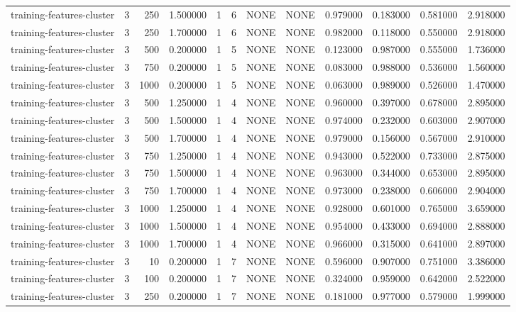 \begin{tabular}{lrrrllllrrrr}
training-features-cluster & 3 & 250 & 1.500000 & 1 & 6 & NONE & NONE & 0.979000 & 0.183000 & 0.581000 & 2.918000 \\
training-features-cluster & 3 & 250 & 1.700000 & 1 & 6 & NONE & NONE & 0.982000 & 0.118000 & 0.550000 & 2.918000 \\
training-features-cluster & 3 & 500 & 0.200000 & 1 & 5 & NONE & NONE & 0.123000 & 0.987000 & 0.555000 & 1.736000 \\
training-features-cluster & 3 & 750 & 0.200000 & 1 & 5 & NONE & NONE & 0.083000 & 0.988000 & 0.536000 & 1.560000 \\
training-features-cluster & 3 & 1000 & 0.200000 & 1 & 5 & NONE & NONE & 0.063000 & 0.989000 & 0.526000 & 1.470000 \\
training-features-cluster & 3 & 500 & 1.250000 & 1 & 4 & NONE & NONE & 0.960000 & 0.397000 & 0.678000 & 2.895000 \\
training-features-cluster & 3 & 500 & 1.500000 & 1 & 4 & NONE & NONE & 0.974000 & 0.232000 & 0.603000 & 2.907000 \\
training-features-cluster & 3 & 500 & 1.700000 & 1 & 4 & NONE & NONE & 0.979000 & 0.156000 & 0.567000 & 2.910000 \\
training-features-cluster & 3 & 750 & 1.250000 & 1 & 4 & NONE & NONE & 0.943000 & 0.522000 & 0.733000 & 2.875000 \\
training-features-cluster & 3 & 750 & 1.500000 & 1 & 4 & NONE & NONE & 0.963000 & 0.344000 & 0.653000 & 2.895000 \\
training-features-cluster & 3 & 750 & 1.700000 & 1 & 4 & NONE & NONE & 0.973000 & 0.238000 & 0.606000 & 2.904000 \\
training-features-cluster & 3 & 1000 & 1.250000 & 1 & 4 & NONE & NONE & 0.928000 & 0.601000 & 0.765000 & 3.659000 \\
training-features-cluster & 3 & 1000 & 1.500000 & 1 & 4 & NONE & NONE & 0.954000 & 0.433000 & 0.694000 & 2.888000 \\
training-features-cluster & 3 & 1000 & 1.700000 & 1 & 4 & NONE & NONE & 0.966000 & 0.315000 & 0.641000 & 2.897000 \\
training-features-cluster & 3 & 10 & 0.200000 & 1 & 7 & NONE & NONE & 0.596000 & 0.907000 & 0.751000 & 3.386000 \\
training-features-cluster & 3 & 100 & 0.200000 & 1 & 7 & NONE & NONE & 0.324000 & 0.959000 & 0.642000 & 2.522000 \\
training-features-cluster & 3 & 250 & 0.200000 & 1 & 7 & NONE & NONE & 0.181000 & 0.977000 & 0.579000 & 1.999000 \\

\end{tabular}

